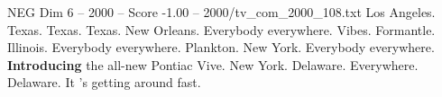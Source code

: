 \begin{textsample}{NEG Dim 6 – 2000 – Score -1.00 – 2000/tv\_com\_2000\_108.txt}  \label{ex:f6_neg_008}
Los Angeles.
Texas.
Texas.
Texas.
New Orleans.
Everybody everywhere.
Vibes.
Formantle.
Illinois.
Everybody everywhere.
Plankton.
New York.
Everybody everywhere. \textbf{Introducing} the all-new Pontiac Vive.
New York.
Delaware.
Everywhere.
Delaware.
It 's getting around fast.

\end{textsample}
